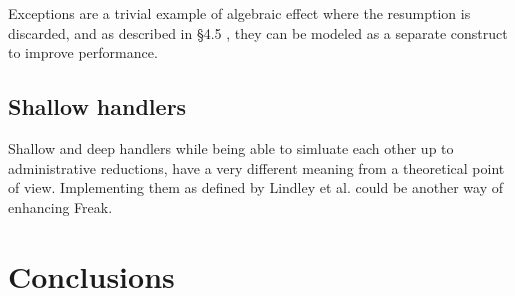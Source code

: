 \documentclass{article}
\theoremstyle{definition}
\theoremstyle{lemma}
\theoremstyle{observation}
\theoremstyle{theorem}
\begin{document}
    Exceptions are a trivial example of algebraic effect where the resumption is
    discarded, and as described in \S 4.5 \cite{handlers-cps}, they can be modeled
    as a separate construct to improve performance.

    \subsection{Shallow handlers}

    Shallow and deep handlers while being able to simluate each other up to
    administrative reductions, have a very different meaning from a theoretical
    point of view. Implementing them as defined by Lindley et al. \cite{shallow-handlers} could
    be another way of enhancing Freak.

\section{Conclusions}

\printbibliography
\end{document}
